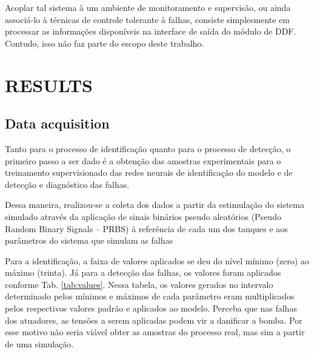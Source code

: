 \documentclass[10pt,fleqn,a4paper]{article}
\begin{document}
Acoplar tal sistema à um ambiente de monitoramento e supervisão, ou ainda
associá-lo à técnicas de controle tolerante à falhas, consiste simplesmente em
processar as informações disponíveis na interface de saída do módulo de DDF.
Contudo, isso não faz parte do escopo deste trabalho.

\section{RESULTS}\label{sec:results}

\subsection{Data acquisition}
Tanto para o processo de identificação quanto para o processo de detecção, o
primeiro passo a ser dado é a obtenção das amostras experimentais para o
treinamento supervisionado das redes neurais de identificação do modelo e de
detecção e diagnóstico das falhas.

Dessa maneira, realizou-se a coleta dos dados a partir da estimulação do sistema
simulado através da aplicação de sinais binários pseudo aleatórios (Pseudo
Random Binary Signals -- PRBS) à referência de cada um dos tanques e aos
parâmetros do sistema que simulam as falhas

Para a identificação, a faixa de valores aplicados se deu do nível mínimo (zero)
ao máximo (trinta). Já para a detecção das falhas, os valores foram aplicados
conforme Tab. \ref{tab:values}. Nessa tabela, os valores gerados no intervalo
determinado pelos mínimos e máximos de cada parâmetro eram multiplicados pelos
respectivos valores padrão e aplicados ao modelo. Perceba que nas falhas dos
atuadores, as tensões a serem aplicadas podem vir a danificar a bomba. Por esse
motivo não seria viável obter as amostras do processo real, mas sim a partir de
uma simulação.
\end{document}
